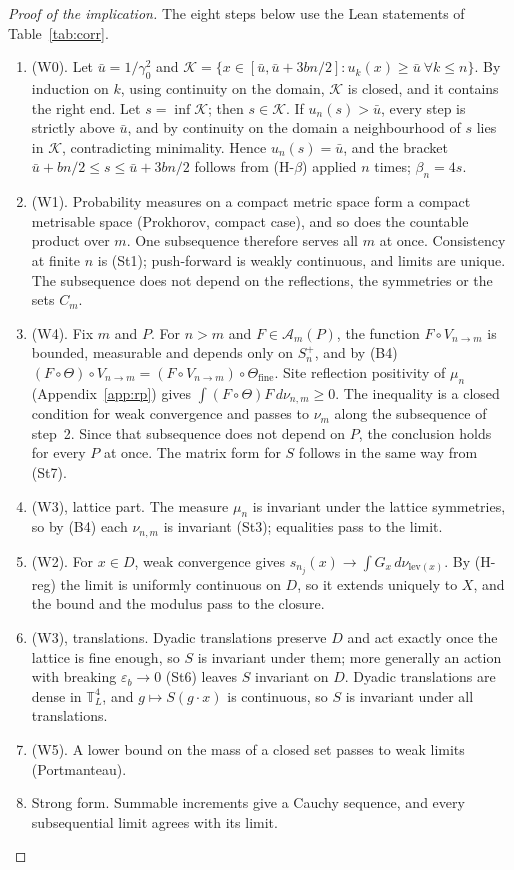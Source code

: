 \documentclass[11pt,a4paper]{article}
\theoremstyle{definition}
\theoremstyle{remark}
\newcommand{\T}{\mathbb{T}}
\begin{document}
\begin{proof}[Proof of the implication]
The eight steps below use the Lean statements of Table~\ref{tab:corr}.
\begin{enumerate}[label=\arabic*.,leftmargin=2em]
\item (W0). Let $\bar u=1/\gamma_0^2$ and $\mathcal K=\{x\in[\bar u,\bar u+3bn/2]:u_k(x)\ge\bar u\ \forall k\le n\}$. By induction on $k$, using continuity on the domain, $\mathcal K$ is closed, and it contains the right end. Let $s=\inf\mathcal K$; then $s\in\mathcal K$. If $u_n(s)>\bar u$, every step is strictly above $\bar u$, and by continuity on the domain a neighbourhood of $s$ lies in $\mathcal K$, contradicting minimality. Hence $u_n(s)=\bar u$, and the bracket $\bar u+bn/2\le s\le\bar u+3bn/2$ follows from (H-$\beta$) applied $n$ times; $\beta_n=4s$.
\item (W1). Probability measures on a compact metric space form a compact metrisable space (Prokhorov, compact case), and so does the countable product over $m$. One subsequence therefore serves all $m$ at once. Consistency at finite $n$ is (St1); push-forward is weakly continuous, and limits are unique. The subsequence does not depend on the reflections, the symmetries or the sets $C_m$.
\item (W4). Fix $m$ and $P$. For $n>m$ and $F\in\mathcal A_m(P)$, the function $F\circ V_{n\to m}$ is bounded, measurable and depends only on $S_n^+$, and by (B4) $(F\circ\Theta)\circ V_{n\to m}=(F\circ V_{n\to m})\circ\Theta_{\mathrm{fine}}$. Site reflection positivity of $\mu_n$ (Appendix~\ref{app:rp}) gives $\int(F\circ\Theta)F\,d\nu_{n,m}\ge0$. The inequality is a closed condition for weak convergence and passes to $\nu_m$ along the subsequence of step~2. Since that subsequence does not depend on $P$, the conclusion holds for every $P$ at once. The matrix form for $S$ follows in the same way from (St7).
\item (W3), lattice part. The measure $\mu_n$ is invariant under the lattice symmetries, so by (B4) each $\nu_{n,m}$ is invariant (St3); equalities pass to the limit.
\item (W2). For $x\in D$, weak convergence gives $s_{n_j}(x)\to\int G_x\,d\nu_{\mathrm{lev}(x)}$. By (H-reg) the limit is uniformly continuous on $D$, so it extends uniquely to $X$, and the bound and the modulus pass to the closure.
\item (W3), translations. Dyadic translations preserve $D$ and act exactly once the lattice is fine enough, so $S$ is invariant under them; more generally an action with breaking $\varepsilon_b\to0$ (St6) leaves $S$ invariant on $D$. Dyadic translations are dense in $\T^4_L$, and $g\mapsto S(g\cdot x)$ is continuous, so $S$ is invariant under all translations.
\item (W5). A lower bound on the mass of a closed set passes to weak limits (Portmanteau).
\item Strong form. Summable increments give a Cauchy sequence, and every subsequential limit agrees with its limit.\qedhere
\end{enumerate}
\end{proof}
\end{document}
